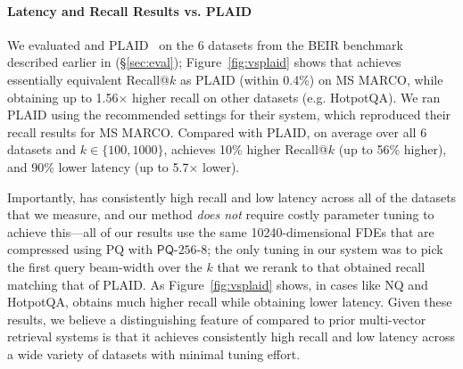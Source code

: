 
\paragraph{Latency and Recall Results vs. PLAID~\cite{santhanam2022plaid}}
We evaluated \name{} and PLAID~\cite{santhanam2022plaid} on the 6 datasets from the BEIR benchmark described earlier in (§\ref{sec:eval}); Figure~\ref{fig:vsplaid} shows that \name{} achieves essentially equivalent Recall@$k$ as PLAID (within 0.4\%) on MS MARCO, while obtaining up to 1.56$\times$ higher recall on other datasets (e.g. HotpotQA).
We ran PLAID using the recommended settings for their system, which reproduced their recall results for MS MARCO.
Compared with PLAID, on average over all $6$ datasets and $k \in \{100,1000\}$, \name{} achieves 10\% higher  Recall@$k$ (up to 56\% higher), and 90\% lower latency (up to 5.7$\times$ lower).



Importantly, \name{} has consistently high recall and low latency across all of the datasets that we measure, and our method {\em does not} require costly parameter tuning to achieve this---all of our results use the same 10240-dimensional FDEs that are compressed using PQ with $\mathsf{PQ}\text{-}256\text{-}8$; the only tuning in our system was to pick the first query beam-width over the $k$ that we rerank to that obtained recall matching that of PLAID. As Figure~\ref{fig:vsplaid} shows, in cases like NQ and HotpotQA, \name{} obtains much higher recall while obtaining lower latency. Given these results, we believe a distinguishing feature of \name{} compared to prior multi-vector retrieval systems is that it achieves consistently high recall and low latency across a wide variety of datasets with minimal tuning effort.

